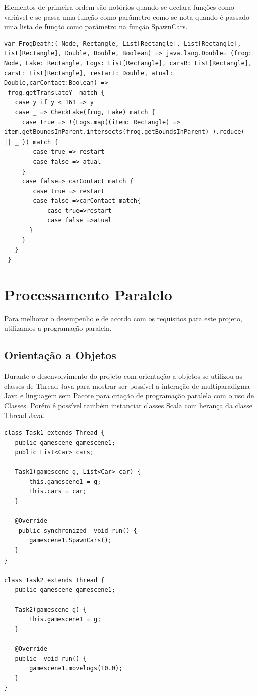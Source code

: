 \documentclass[rel-mlp]{iiufrgs}
\begin{document}
Elementos de primeira ordem são notórios quando se declara funções como variável e se passa uma função como parâmetro como se nota quando é passado uma lista de função como parâmetro na função SpawnCars.



\begin{lstlisting}
var FrogDeath:( Node, Rectangle, List[Rectangle], List[Rectangle], List[Rectangle], Double, Double, Boolean) => java.lang.Double= (frog: Node, Lake: Rectangle, Logs: List[Rectangle], carsR: List[Rectangle], carsL: List[Rectangle], restart: Double, atual: Double,carContact:Boolean) =>
 frog.getTranslateY  match {
   case y if y < 161 => y
   case _ => CheckLake(frog, Lake) match {
     case true => !(Logs.map((item: Rectangle) => item.getBoundsInParent.intersects(frog.getBoundsInParent) ).reduce( _ || _ )) match {
        case true => restart
        case false => atual
     }
     case false=> carContact match {
        case true => restart
        case false =>carContact match{
            case true=>restart
            case false =>atual
       }
     }
   }
 }
\end{lstlisting}


\newpage
\section{Processamento Paralelo}

Para melhorar o desempenho e de acordo com os requisitos para este projeto, utilizamos a programação paralela.

\subsection{Orientação a Objetos}
 Durante o desenvolvimento do projeto com orientação a objetos se utilizou as classes de Thread Java para mostrar ser possível a interação de multiparadigma Java e linguagem sem Pacote para criação de programação paralela com o uso de Classes. Porém é possível também instanciar classes Scala com herança da classe Thread Java.
 
\begin{lstlisting}
class Task1 extends Thread {
   public gamescene gamescene1;
   public List<Car> cars;

   Task1(gamescene g, List<Car> car) {
       this.gamescene1 = g;
       this.cars = car;
   }

   @Override
    public synchronized  void run() {
       gamescene1.SpawnCars();
   }
}

class Task2 extends Thread {
   public gamescene gamescene1;

   Task2(gamescene g) {
       this.gamescene1 = g;
   }

   @Override
   public  void run() {
       gamescene1.movelogs(10.0);
   }
}
\end{lstlisting}
\end{document}
